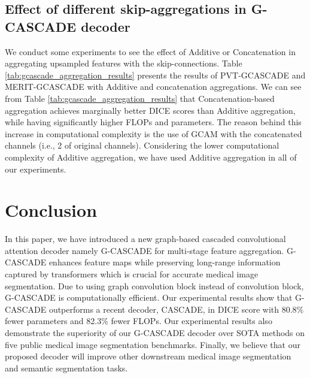 \documentclass[10pt,twocolumn,letterpaper]{article}
\begin{document}
\subsection{Effect of different skip-aggregations in G-CASCADE decoder}
We conduct some experiments to see the effect of Additive or Concatenation in aggregating upsampled features with the skip-connections. Table \ref{tab:gcascade_aggregation_results} presents the results of PVT-GCASCADE and MERIT-GCASCADE with Additive and concatenation aggregations. We can see from Table \ref{tab:gcascade_aggregation_results} that Concatenation-based aggregation achieves marginally better DICE scores than Additive aggregation, while having significantly higher FLOPs and parameters. The reason behind this increase in computational complexity is the use of GCAM with the concatenated channels (i.e., 2 of original channels). Considering the lower computational complexity of Additive aggregation, we have used Additive aggregation in all of our experiments. 


\section{Conclusion}
\label{sec:conclusion}
In this paper, we have introduced a new graph-based cascaded convolutional attention decoder namely G-CASCADE for multi-stage feature aggregation. G-CASCADE enhances feature maps while preserving long-range information captured by transformers which is crucial for accurate medical image segmentation. Due to using graph convolution block instead of  convolution block, G-CASCADE is computationally efficient. Our experimental results show that G-CASCADE outperforms a recent decoder, CASCADE, in DICE score \color{black}with 80.8\% fewer parameters and 82.3\% fewer FLOPs\color{black}. Our experimental results also demonstrate the superiority of our G-CASCADE decoder over SOTA methods on \color{black}five \color{black}public medical image segmentation benchmarks. Finally, we believe that our proposed decoder will improve other downstream medical image segmentation and semantic segmentation tasks.  
 











{\small


}

\appendix
\end{document}
